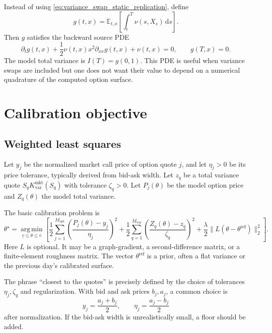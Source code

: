 \documentclass[11pt]{article}
\newcommand{\E}{\mathbb{E}}
\newcommand{\1}{\mathbf{1}}
\newcommand{\dd}{\,\mathrm{d}}
\newcommand{\vloc}{\nu}
\newcommand{\argmin}{\operatorname*{arg\,min}}
\begin{document}
Instead of using \eqref{eq:variance_swap_static_replication}, define
\[
  g(t,x)=\E_{t,x}\left[\int_t^T\vloc(s,X_s)\dd s\right].
\]
Then $g$ satisfies the backward source PDE
\begin{equation}
  \partial_tg(t,x)+\frac12\vloc(t,x)x^2\partial_{xx}g(t,x)+\vloc(t,x)=0,
  \qquad
  g(T,x)=0.
  \label{eq:variance_swap_source_pde}
\end{equation}
The model total variance is $I(T)=g(0,1)$. This PDE is useful when variance swaps are
included but one does not want their value to depend on a numerical quadrature of the
computed option surface.

\section{Calibration objective}

\subsection{Weighted least squares}

Let $y_j$ be the normalized market call price of option quote $j$, and let
$\eta_j>0$ be its price tolerance, typically derived from bid-ask width. Let
$z_q$ be a total variance quote $S_qK_{\mathrm{var}}^{\mathrm{mkt}}(S_q)$ with tolerance
$\zeta_q>0$. Let $P_j(\theta)$ be the model option price and $Z_q(\theta)$ the model
total variance.

The basic calibration problem is
\begin{equation}
  \boxed{
  \theta^\star
  =
  \argmin_{\underline v\le\theta\le\overline v}
  \left[
  \frac12\sum_{j=1}^{M_{\mathrm{opt}}}
    \left(\frac{P_j(\theta)-y_j}{\eta_j}\right)^2
  +
  \frac12\sum_{q=1}^{M_{\mathrm{var}}}
    \left(\frac{Z_q(\theta)-z_q}{\zeta_q}\right)^2
  +
  \frac{\lambda}{2}\|L(\theta-\theta^{\mathrm{ref}})\|_2^2
  \right].
  }
  \label{eq:calibration_objective}
\end{equation}
Here $L$ is optional. It may be a graph-gradient, a second-difference matrix, or a
finite-element roughness matrix. The vector $\theta^{\mathrm{ref}}$ is a prior, often a
flat variance or the previous day's calibrated surface.

The phrase ``closest to the quotes'' is precisely defined by the choice of tolerances
$\eta_j,\zeta_q$ and regularization. With bid and ask prices $b_j,a_j$, a common choice is
\[
  y_j=\frac{a_j+b_j}{2},
  \qquad
  \eta_j=\frac{a_j-b_j}{2}
\]
after normalization. If the bid-ask width is unrealistically small, a floor should be
added.
\end{document}
